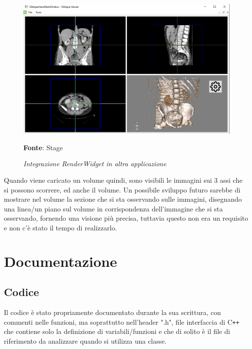 \begin{figure}[h]
    \centering
    \includegraphics[width=1\textwidth]{immagini/svolgimento/obliqueview.png}
    \caption{\textit{Integrazione RenderWidget in altra applicazione}}
    \textbf{Fonte}: Stage
    \label{fig: Porting RenderWidget}
\end{figure}

Quando viene caricato un volume quindi, sono visibili le immagini sui 3 assi che si possono scorrere, ed anche il volume. Un possibile sviluppo futuro sarebbe di mostrare nel volume la sezione che si sta osservando sulle immagini, disegnando una linea/un piano sul volume in corrispondenza dell'immagine che si sta osservando, fornendo una visione più precisa, tuttavia questo non era un requisito e non c'è stato il tempo di realizzarlo.

\section{Documentazione}
\subsection{Codice}
Il codice è stato propriamente documentato durante la sua scrittura, con commenti nelle funzioni, ma soprattutto nell'header ".h", file interfaccia di C\texttt{++} che contiene solo la definizione di variabili/funzioni e che di solito è il file di riferimento da analizzare quando si utilizza una classe.

